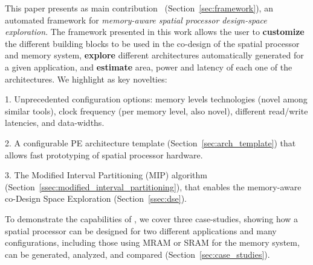 This paper presents as main contribution \frameworkname~(Section~\ref{sec:framework}), an automated framework for \textit{memory-aware spatial processor design-space exploration}. The framework presented in this work allows the user to \textbf{customize} the different building blocks to be used in the co-design of the spatial processor and memory system, \textbf{explore} different architectures automatically generated for a given application, and \textbf{estimate} area, power and latency of each one of the architectures.
We highlight as key novelties:

1. Unprecedented configuration options: memory levels technologies (novel among similar tools), clock frequency (per memory level, also novel), different read/write latencies, and data-widths.

2. A configurable PE architecture template (Section~\ref{sec:arch_template}) that allows fast prototyping of spatial processor hardware.

3. The Modified Interval Partitioning (MIP) algorithm (Section~\ref{ssec:modified_interval_partitioning}), that enables the memory-aware co-Design Space Exploration (Section~\ref{ssec:dse}).

To demonstrate the capabilities of \frameworkname, we cover three case-studies, showing how a spatial processor can be designed for two different applications and many configurations, including those using MRAM or SRAM for the memory system, can be generated, analyzed, and compared (Section~\ref{sec:case_studies}).




